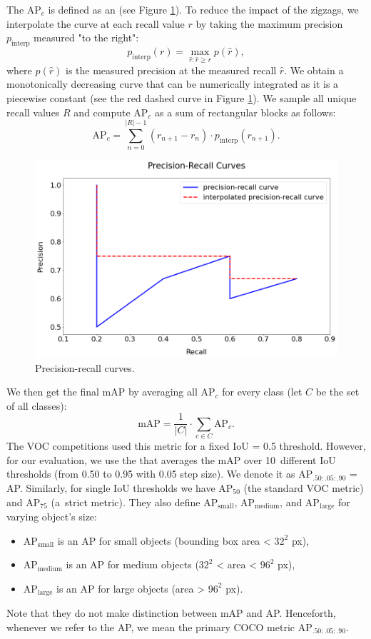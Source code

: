 The AP$_c$ is defined as an  (see Figure \ref{fig:precisionrecall}). To reduce the impact of the zigzags, we interpolate the curve at each recall value $r$ by taking the maximum precision $p_\text{interp}$ measured "to the right":
$$
p_\text{interp}(r) = \max\limits_{\hat{r}:\hat{r} \geq r} p(\hat{r}),
$$
where $p(\hat{r})$ is the measured precision at the measured recall $\hat{r}$. We obtain a monotonically decreasing curve that can be numerically integrated as it is a piecewise constant (see the red dashed curve in Figure \ref{fig:precisionrecall}). We sample all unique recall values $R$ and compute AP$_c$ as a sum of rectangular blocks as follows:
$$
\text{AP}_c = \sum\limits^{\lvert R\rvert - 1}_{n = 0} (r_{n+1} - r_n) \cdot p_\text{interp}(r_{n+1}).
$$

\begin{figure}[H]
    \centering
    \includegraphics[width=0.8\linewidth]{Sources/Figures/precisionrecall.png}
    \caption{Precision-recall curves.}
    \label{fig:precisionrecall}
\end{figure}

We then get the final mAP by averaging all AP$_c$ for every class (let $C$ be the set of all classes):
$$
    \text{mAP} = \frac{1}{\lvert C \rvert} \cdot \sum_{ c\in C} \text{AP}_c.
$$
The VOC competitions \cite{voc} used this metric for a fixed IoU = 0.5 threshold. However, for our evaluation, we use the  \cite{coco} that averages the mAP over 10~different IoU thresholds (from 0.50 to 0.95 with 0.05 step size). We denote it as AP$_{.50:.05:.90}$ = AP. Similarly, for single IoU thresholds we have AP$_{50}$ (the standard VOC metric) and AP$_{75}$ (a~strict metric). They also define AP$_\text{small}$, AP$_\text{medium}$, and AP$_\text{large}$ for varying object's size:
\begin{itemize}
    \item AP$_\text{small}$ is an AP for small objects (bounding box area < $32^2$ px),
    \item AP$_\text{medium}$ is an AP for medium objects ($32^2$ < area < $96^2$ px),
    \item AP$_\text{large}$ is an AP for large objects (area > $96^2$ px).
\end{itemize}
Note that they do not make distinction between mAP and AP. Henceforth, whenever we refer to the AP, we mean the primary COCO metric AP$_{.50:.05:.90}$. 










